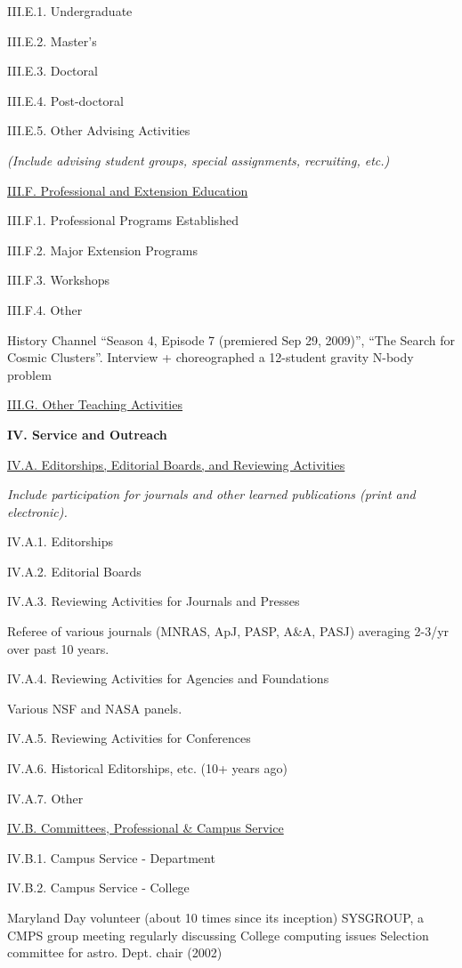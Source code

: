 \documentclass[11pt,letterpaper]{article}
\newcommand{\newi}{\newline\indent}
\begin{document}
III.E.1. Undergraduate

III.E.2. Master's

III.E.3. Doctoral

III.E.4. Post-doctoral

III.E.5. Other Advising Activities


\textit{(Include advising student groups, special assignments, recruiting, etc.)}


\underline{III.F. Professional and Extension Education}

III.F.1. Professional Programs Established

III.F.2. Major Extension Programs

III.F.3. Workshops

III.F.4. Other

History Channel ``Season 4, Episode 7 (premiered Sep 29, 2009)'',
``The Search for Cosmic Clusters''. Interview + choreographed a 12-student gravity N-body problem



\underline{III.G. Other Teaching Activities}


\textbf{IV. Service and Outreach}


\underline{IV.A. Editorships, Editorial Boards, and Reviewing Activities}

\textit{Include participation for journals and other learned publications (print and electronic).}

IV.A.1. Editorships

IV.A.2. Editorial Boards

IV.A.3. Reviewing Activities for Journals and Presses

Referee of various journals (MNRAS, ApJ, PASP, A\&A, PASJ) averaging 2-3/yr over past 10 years.


IV.A.4. Reviewing Activities for Agencies and Foundations

Various NSF and NASA panels.

IV.A.5. Reviewing Activities for Conferences

IV.A.6. Historical Editorships, etc. (10+ years ago)

IV.A.7. Other


\underline{IV.B. Committees, Professional \& Campus Service}

IV.B.1. Campus Service - Department

IV.B.2. Campus Service - College

Maryland Day volunteer (about 10 times since its inception)\newi
SYSGROUP, a CMPS group meeting regularly discussing College computing issues\newi
Selection committee for astro. Dept. chair (2002)\newi
\end{document}
